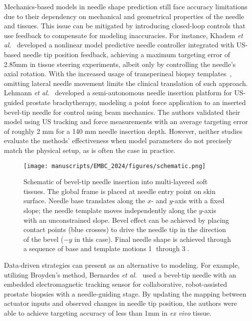 Mechanics-based models in needle shape prediction still face accuracy limitations due to their dependency on mechanical and geometrical properties of the needle and tissues. This issue can be mitigated by introducing closed-loop controls that use feedback to compensate for modeling inaccuracies. For instance, Khadem \textit{et al.}~\parencite{khademUltrasoundGuidedModelPredictive2016} developed a nonlinear model predictive needle controller integrated with US-based needle tip position feedback, achieving a maximum targeting error of 2.85mm in tissue steering experiments, albeit only by controlling the needle's axial rotation. With the increased usage of transperineal biopsy templates~\parencite{abdulmajedRoleTransperinealTemplate2015}, omitting lateral needle movement limits the clinical translation of such approach. Lehmann \textit{et al.}~\parencite{lehmannDeflectionModelingNeedle2017} developed a semi-autonomous needle insertion platform for US-guided prostate brachytherapy, modeling a point force application to an inserted bevel-tip needle for control using beam mechanics. The authors validated their model using US tracking and force measurements with an average targeting error of roughly 2 mm for a 140 mm needle insertion depth. However, neither studies~\parencite{lehmannDeflectionModelingNeedle2017,khademUltrasoundGuidedModelPredictive2016} evaluate the methods' effectiveness when model parameters do not precisely match the physical setup, as is often the case in practice.

\begin{figure}[t]
  \centering
  \texttt{[image: manuscripts/EMBC\_2024/figures/schematic.png]}
  \caption{Schematic of bevel-tip needle insertion into multi-layered soft tissues. The global frame is placed at needle entry point on skin surface. Needle base translates along the $x$- and $y$-axis with a fixed slope; the needle template moves independently along the $y$-axis with an unconstrained slope. Bevel effect can be achieved by placing contact points (blue crosses) to drive the needle tip in the direction of the bevel ($-y$ in this case). Final needle shape is achieved through a sequence of base and template motions \textcircled{1} through \textcircled{3}.}
  \label{fig:chap-4-schematic}
\end{figure}

Data-driven strategies can present as an alternative to modeling. For example, utilizing Broyden's method, Bernardes \textit{et al.}~\parencite{bernardesDataDrivenAdaptiveNeedle2023} used a bevel-tip needle with an embedded electromagnetic tracking sensor for collaborative, robot-assisted prostate biopsies with a needle-guiding stage. By updating the mapping between actuator inputs and observed changes in needle tip position, the authors were able to achieve targeting accuracy of less than 1mm in \textit{ex vivo} tissue.

